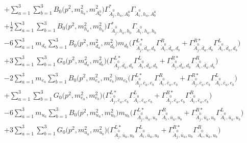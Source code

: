\begin{itemize}
\begin{align}
 &+\sum_{a=1}^{3}\sum_{b=1}^{3}{B_0\Big(p^{2},m^2_{h_{{a}}},m^2_{A^0_{{b}}}\Big)} {\Gamma^*_{\check{A}^0_{{j}},h_{{a}},A^0_{{b}}}} {\Gamma_{\check{A}^0_{{i}},h_{{a}},A^0_{{b}}}} \nonumber \\ 
 &+\frac{1}{2} \sum_{a=1}^{3}\sum_{b=1}^{3}{B_0\Big(p^{2},m^2_{h_{{a}}},m^2_{h_{{b}}}\Big)} {\Gamma^*_{\check{A}^0_{{j}},h_{{a}},h_{{b}}}} {\Gamma_{\check{A}^0_{{i}},h_{{a}},h_{{b}}}}  \nonumber \\ 
 &-6 \sum_{a=1}^{3}m_{d_{{a}}} \sum_{b=1}^{3}{B_0\Big(p^{2},m^2_{d_{{a}}},m^2_{d_{{b}}}\Big)} m_{d_{{b}}} \Big({\Gamma^{L*}_{\check{A}^0_{{j}},\bar{d}_{{a}},d_{{b}}}} {\Gamma^R_{\check{A}^0_{{i}},\bar{d}_{{a}},d_{{b}}}}  + {\Gamma^{R*}_{\check{A}^0_{{j}},\bar{d}_{{a}},d_{{b}}}} {\Gamma^L_{\check{A}^0_{{i}},\bar{d}_{{a}},d_{{b}}}} \Big)  \nonumber \\ 
 &+3 \sum_{a=1}^{3}\sum_{b=1}^{3}{G_0\Big(p^{2},m^2_{d_{{a}}},m^2_{d_{{b}}}\Big)} \Big({\Gamma^{L*}_{\check{A}^0_{{j}},\bar{d}_{{a}},d_{{b}}}} {\Gamma^L_{\check{A}^0_{{i}},\bar{d}_{{a}},d_{{b}}}}  + {\Gamma^{R*}_{\check{A}^0_{{j}},\bar{d}_{{a}},d_{{b}}}} {\Gamma^R_{\check{A}^0_{{i}},\bar{d}_{{a}},d_{{b}}}} \Big) \nonumber \\ 
 &-2 \sum_{a=1}^{3}m_{e_{{a}}} \sum_{b=1}^{3}{B_0\Big(p^{2},m^2_{e_{{a}}},m^2_{e_{{b}}}\Big)} m_{e_{{b}}} \Big({\Gamma^{L*}_{\check{A}^0_{{j}},\bar{e}_{{a}},e_{{b}}}} {\Gamma^R_{\check{A}^0_{{i}},\bar{e}_{{a}},e_{{b}}}}  + {\Gamma^{R*}_{\check{A}^0_{{j}},\bar{e}_{{a}},e_{{b}}}} {\Gamma^L_{\check{A}^0_{{i}},\bar{e}_{{a}},e_{{b}}}} \Big)  \nonumber \\ 
 &+\sum_{a=1}^{3}\sum_{b=1}^{3}{G_0\Big(p^{2},m^2_{e_{{a}}},m^2_{e_{{b}}}\Big)} \Big({\Gamma^{L*}_{\check{A}^0_{{j}},\bar{e}_{{a}},e_{{b}}}} {\Gamma^L_{\check{A}^0_{{i}},\bar{e}_{{a}},e_{{b}}}}  + {\Gamma^{R*}_{\check{A}^0_{{j}},\bar{e}_{{a}},e_{{b}}}} {\Gamma^R_{\check{A}^0_{{i}},\bar{e}_{{a}},e_{{b}}}} \Big)\nonumber \\ 
 &-6 \sum_{a=1}^{3}m_{u_{{a}}} \sum_{b=1}^{3}{B_0\Big(p^{2},m^2_{u_{{a}}},m^2_{u_{{b}}}\Big)} m_{u_{{b}}} \Big({\Gamma^{L*}_{\check{A}^0_{{j}},\bar{u}_{{a}},u_{{b}}}} {\Gamma^R_{\check{A}^0_{{i}},\bar{u}_{{a}},u_{{b}}}}  + {\Gamma^{R*}_{\check{A}^0_{{j}},\bar{u}_{{a}},u_{{b}}}} {\Gamma^L_{\check{A}^0_{{i}},\bar{u}_{{a}},u_{{b}}}} \Big)  \nonumber \\ 
 &+3 \sum_{a=1}^{3}\sum_{b=1}^{3}{G_0\Big(p^{2},m^2_{u_{{a}}},m^2_{u_{{b}}}\Big)} \Big({\Gamma^{L*}_{\check{A}^0_{{j}},\bar{u}_{{a}},u_{{b}}}} {\Gamma^L_{\check{A}^0_{{i}},\bar{u}_{{a}},u_{{b}}}}  + {\Gamma^{R*}_{\check{A}^0_{{j}},\bar{u}_{{a}},u_{{b}}}} {\Gamma^R_{\check{A}^0_{{i}},\bar{u}_{{a}},u_{{b}}}} \Big) \nonumber \\ 

\end{align}
\end{itemize}
